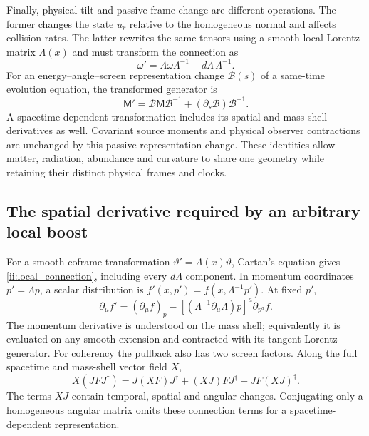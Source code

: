 Finally, physical tilt and passive frame change are different operations. The former changes the state $u_r$ relative to the homogeneous normal and affects collision rates. The latter rewrites the same tensors using a smooth local Lorentz matrix $\Lambda(x)$ and must transform the connection as
\begin{equation}
 \omega'=\Lambda\omega\Lambda^{-1}-d\Lambda\,\Lambda^{-1}.
 \label{ii:local_connection}
\end{equation}
For an energy--angle--screen representation change $\mathcal B(s)$ of a same-time evolution equation, the transformed generator is
\begin{equation}
 \mathsf M'=\mathcal B\mathsf M\mathcal B^{-1}
                  +(\partial_s\mathcal B)\mathcal B^{-1}.
 \label{ii:moving_generator}
\end{equation}
A spacetime-dependent transformation includes its spatial and mass-shell derivatives as well. Covariant source moments and physical observer contractions are unchanged by this passive representation change. These identities allow matter, radiation, abundance and curvature to share one geometry while retaining their distinct physical frames and clocks.


\subsection{The spatial derivative required by an arbitrary local boost}
For a smooth coframe transformation $\vartheta'=\Lambda(x)\vartheta$, Cartan's equation gives \eqref{ii:local_connection}, including every $d\Lambda$ component. In momentum coordinates $p'=\Lambda p$, a scalar distribution is $f'(x,p')=f(x,\Lambda^{-1}p')$. At fixed $p'$,
\begin{equation}
 \partial_\mu f'=(\partial_\mu f)_p
  -[(\Lambda^{-1}\partial_\mu\Lambda)p]^a\partial_{p^a}f.
 \label{ii:boost_spatial_derivative}
\end{equation}
The momentum derivative is understood on the mass shell; equivalently it is evaluated on any smooth extension and contracted with its tangent Lorentz generator. For coherency the pullback also has two screen factors. Along the full spacetime and mass-shell vector field $X$,
\begin{equation}
 X(JFJ^\dagger)=J(XF)J^\dagger+(XJ)FJ^\dagger+JF(XJ)^\dagger.
 \label{ii:boost_screen_derivative}
\end{equation}
The terms $XJ$ contain temporal, spatial and angular changes. Conjugating only a homogeneous angular matrix omits these connection terms for a spacetime-dependent representation.

